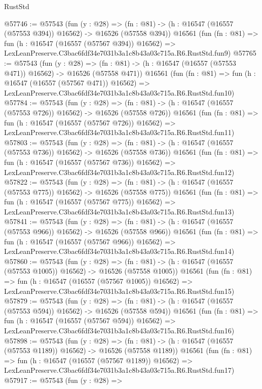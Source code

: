 \begin{lexlean}{RustStd}
\begin{coremodule}
@57746 := @57543
    (fun (y : @28) =>
    (fn : @81) -> (h : @16547 (@16557 (@57553 @394)) @16562) -> @16526 (@57558 @394))
    @16561
    (fun (fn : @81) =>
    fun (h : @16547 (@16557 (@57567 @394)) @16562) =>
    LexLeanPreserve.C3bac6fdf34e7031b3a1c8b43a03c715a.R6.RustStd.fun9)
@57765 := @57543
    (fun (y : @28) =>
    (fn : @81) -> (h : @16547 (@16557 (@57553 @471)) @16562) -> @16526 (@57558 @471))
    @16561
    (fun (fn : @81) =>
    fun (h : @16547 (@16557 (@57567 @471)) @16562) =>
    LexLeanPreserve.C3bac6fdf34e7031b3a1c8b43a03c715a.R6.RustStd.fun10)
@57784 := @57543
    (fun (y : @28) =>
    (fn : @81) -> (h : @16547 (@16557 (@57553 @726)) @16562) -> @16526 (@57558 @726))
    @16561
    (fun (fn : @81) =>
    fun (h : @16547 (@16557 (@57567 @726)) @16562) =>
    LexLeanPreserve.C3bac6fdf34e7031b3a1c8b43a03c715a.R6.RustStd.fun11)
@57803 := @57543
    (fun (y : @28) =>
    (fn : @81) -> (h : @16547 (@16557 (@57553 @736)) @16562) -> @16526 (@57558 @736))
    @16561
    (fun (fn : @81) =>
    fun (h : @16547 (@16557 (@57567 @736)) @16562) =>
    LexLeanPreserve.C3bac6fdf34e7031b3a1c8b43a03c715a.R6.RustStd.fun12)
@57822 := @57543
    (fun (y : @28) =>
    (fn : @81) -> (h : @16547 (@16557 (@57553 @775)) @16562) -> @16526 (@57558 @775))
    @16561
    (fun (fn : @81) =>
    fun (h : @16547 (@16557 (@57567 @775)) @16562) =>
    LexLeanPreserve.C3bac6fdf34e7031b3a1c8b43a03c715a.R6.RustStd.fun13)
@57841 := @57543
    (fun (y : @28) =>
    (fn : @81) -> (h : @16547 (@16557 (@57553 @966)) @16562) -> @16526 (@57558 @966))
    @16561
    (fun (fn : @81) =>
    fun (h : @16547 (@16557 (@57567 @966)) @16562) =>
    LexLeanPreserve.C3bac6fdf34e7031b3a1c8b43a03c715a.R6.RustStd.fun14)
@57860 := @57543
    (fun (y : @28) =>
    (fn : @81) -> (h : @16547 (@16557 (@57553 @1005)) @16562) -> @16526 (@57558 @1005))
    @16561
    (fun (fn : @81) =>
    fun (h : @16547 (@16557 (@57567 @1005)) @16562) =>
    LexLeanPreserve.C3bac6fdf34e7031b3a1c8b43a03c715a.R6.RustStd.fun15)
@57879 := @57543
    (fun (y : @28) =>
    (fn : @81) -> (h : @16547 (@16557 (@57553 @594)) @16562) -> @16526 (@57558 @594))
    @16561
    (fun (fn : @81) =>
    fun (h : @16547 (@16557 (@57567 @594)) @16562) =>
    LexLeanPreserve.C3bac6fdf34e7031b3a1c8b43a03c715a.R6.RustStd.fun16)
@57898 := @57543
    (fun (y : @28) =>
    (fn : @81) -> (h : @16547 (@16557 (@57553 @1189)) @16562) -> @16526 (@57558 @1189))
    @16561
    (fun (fn : @81) =>
    fun (h : @16547 (@16557 (@57567 @1189)) @16562) =>
    LexLeanPreserve.C3bac6fdf34e7031b3a1c8b43a03c715a.R6.RustStd.fun17)
@57917 := @57543
    (fun (y : @28) =>

\end{coremodule}
\end{lexlean}
